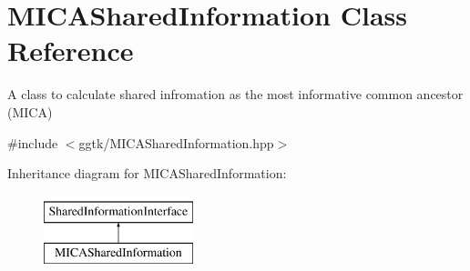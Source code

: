 \hypertarget{classMICASharedInformation}{}\section{M\+I\+C\+A\+Shared\+Information Class Reference}
\label{classMICASharedInformation}


A class to calculate shared infromation as the most informative common ancestor (M\+I\+CA)  




{\ttfamily \#include $<$ggtk/\+M\+I\+C\+A\+Shared\+Information.\+hpp$>$}

Inheritance diagram for M\+I\+C\+A\+Shared\+Information\+:\begin{figure}[H]
\begin{center}
\leavevmode
\includegraphics[height=2.000000cm]{classMICASharedInformation}
\end{center}
\end{figure}
